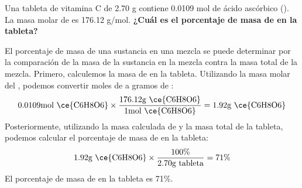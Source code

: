 Una tableta de vitamina C de 2.70 g contiene 0.0109 mol de ácido ascórbico (). La masa molar de  es 176.12 g/mol.
\textbf{¿Cuál es el porcentaje de masa de  en la tableta?}\\

\begin{solutionbox}{7cm}
    El porcentaje de masa de una sustancia en una mezcla se puede determinar por la comparación de la masa de la sustancia en la mezcla contra la masa total de la mezcla.
    Primero, calculemos la masa de  en la tableta. Utilizando la masa molar del , podemos convertir moles de  a gramos de :
    \[0.0109\text{mol \ce{C6H8O6}} \times \frac{176.12\text{g \ce{C6H8O6}}}{1\text{mol \ce{C6H8O6}}} = 1.92 \text{g \ce{C6H8O6}}\]
    Posteriormente, utilizando la masa calculada de  y la masa total de la tableta, podemos calcular el porcentaje de masa de  en la tableta:
    \[1.92\text{g \ce{C6H8O6}} \times \frac{100\%}{2.70\text{g tableta}} = 71\%\]
    El porcentaje de masa de  en la tableta es 71\%.
\end{solutionbox}